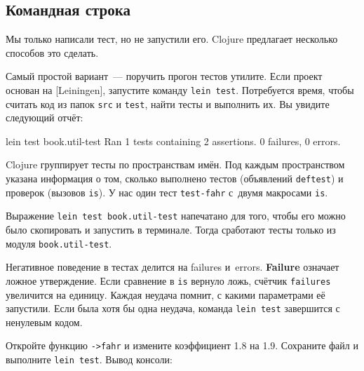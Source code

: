 \subsection{Командная строка}

Мы только написали тест, но не запустили его. Clojure предлагает несколько
способов это сделать.


Самый простой вариант~--- поручить прогон тестов утилите. Если проект основан на
[Leiningen], запустите команду \verb|lein test|.
Потребуется время, чтобы считать код из папок \verb|src| и \verb|test|,
найти тесты и выполнить их. Вы увидите следующий отчёт:

\begin{english}
  \begin{text}
lein test book.util-test
Ran 1 tests containing 2 assertions.
0 failures, 0 errors.
  \end{text}
\end{english}

Clojure группирует тесты по пространствам имён. Под каждым пространством указана
информация о том, сколько выполнено тестов (объявлений \verb|deftest|) и
проверок (вызовов \verb|is|). У нас один тест \verb|test-fahr| с~двумя макросами
\verb|is|.


Выражение \verb|lein test book.util-test| напечатано для того, чтобы его можно
было скопировать и запустить в терминале. Тогда сработают тесты только из модуля
\verb|book.util-test|.

Негативное поведение в тестах делится на failures
и~errors. \textbf{Failure}  означает ложное утверждение. Если
сравнение в \verb|is| вернуло ложь, счётчик \verb|failures| увеличится на
единицу. Каждая неудача помнит, с какими параметрами её запустили. Если была
хотя бы одна неудача, команда \verb|lein test| завершится с ненулевым кодом.

Откройте функцию \verb|->fahr| и измените коэффициент 1.8 на 1.9. Сохраните файл
и выполните \verb|lein test|. Вывод консоли:

\begin{english}
\end{english}

